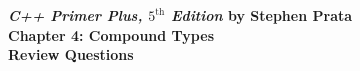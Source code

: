 \documentclass{amsart}
\begin{document}
\begin{center}
	\Large {\bfseries
	\emph{C++ Primer Plus, $5^{\text{th}}$ Edition} by Stephen Prata \\
	Chapter 4: Compound Types \\
	Review Questions} \normalsize \vspace{.5 cm}
\end{center}


\end{document}

